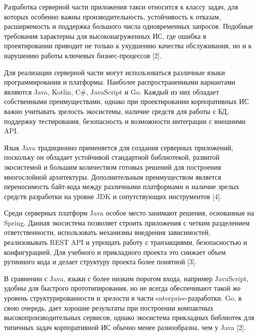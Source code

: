 {\gostFont

  \par \redline Разработка серверной части приложения такси относится к классу задач, для которых особенно важны производительность, устойчивость к отказам, расширяемость и поддержка большого числа одновременных запросов. Подобные требования характерны для высоконагруженных ИС, где ошибка в проектировании приводит не только к ухудшению качества обслуживания, но и к нарушению работы ключевых бизнес-процессов [2].

  \par \redline Для реализации серверной части могут использоваться различные языки программирования и платформы. Наиболее распространенными вариантами являются Java, Kotlin, C\#, JavaScript и Go. Каждый из них обладает собственными преимуществами, однако при проектировании корпоративных ИС важно учитывать зрелость экосистемы, наличие средств для работы с БД, поддержку тестирования, безопасность и возможности интеграции с внешними API.

  \par \redline Язык Java традиционно применяется для создания серверных приложений, поскольку он обладает устойчивой стандартной библиотекой, развитой экосистемой и большим количеством готовых решений для построения многослойной архитектуры. Дополнительным преимуществом является переносимость байт-кода между различными платформами и наличие зрелых средств разработки на уровне JDK и сопутствующих инструментов [4].

  \par \redline Среди серверных платформ Java особое место занимают решения, основанные на Spring. Данная экосистема позволяет строить приложения с четким разделением ответственности, использовать механизмы внедрения зависимостей, реализовывать REST API и упрощать работу с транзакциями, безопасностью и конфигурацией. Для учебного и прикладного проекта это снижает объем рутинного кода и делает структуру проекта более понятной [3].

  \par \redline В сравнении с Java, языки с более низким порогом входа, например JavaScript, удобны для быстрого прототипирования, но не всегда обеспечивают такой же уровень структурированности и зрелости в части enterprise-разработки. Go, в свою очередь, дает хорошие результаты при построении компактных высокопроизводительных сервисов, однако экосистема прикладных библиотек для типичных задач корпоративной ИС обычно менее разнообразна, чем у Java [2].

}
